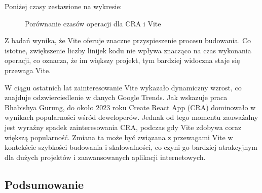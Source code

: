 \documentclass{article}
\begin{document}
Poniżej czasy zestawione na wykresie:


\begin{figure}[H]
\centering
{}
\caption{Porównanie czasów operacji dla CRA i Vite}
\label{fig:cra_vs_vite}
\end{figure}

Z badań wynika, że Vite oferuje znaczne przyspieszenie procesu budowania. Co istotne, zwiększenie liczby linijek kodu nie wpływa znacząco na czas wykonania operacji, co oznacza, że im większy projekt, tym bardziej widoczna staje się przewaga Vite.

W ciągu ostatnich lat zainteresowanie Vite wykazało dynamiczny wzrost, co znajduje odzwierciedlenie w danych Google Trends. Jak wskazuje praca Bhabishya Gurung\cite{babisha}, do około 2023 roku Create React App (CRA) dominowało w wynikach popularności wśród deweloperów. Jednak od tego momentu zauważalny jest wyraźny spadek zainteresowania CRA, podczas gdy Vite zdobywa coraz większą popularność. Zmiana ta może być związana z przewagami Vite w kontekście szybkości budowania i skalowalności, co czyni go bardziej atrakcyjnym dla dużych projektów i zaawansowanych aplikacji internetowych.

\subsection{Podsumowanie}
\end{document}
